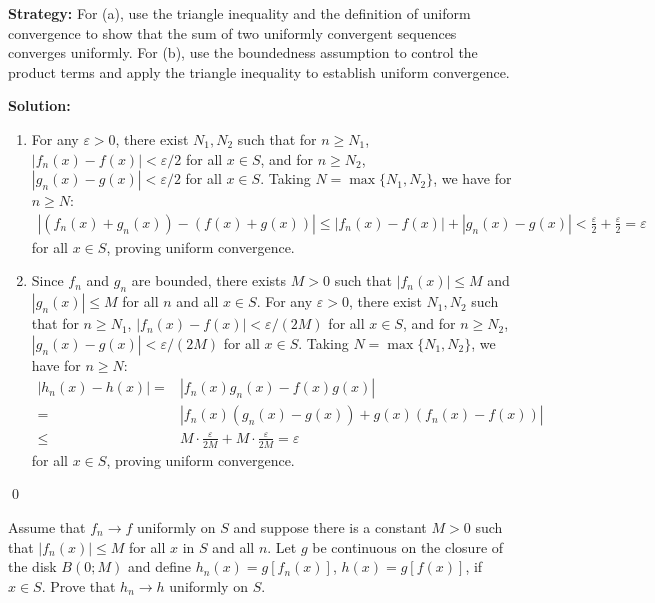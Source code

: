 \noindent\textbf{Strategy:} For (a), use the triangle inequality and the definition of uniform convergence to show that the sum of two uniformly convergent sequences converges uniformly. For (b), use the boundedness assumption to control the product terms and apply the triangle inequality to establish uniform convergence.

\bigskip\noindent\textbf{Solution:}
\begin{enumerate}[label=(\alph*)]
\item For any \( \varepsilon > 0 \), there exist \( N_1, N_2 \) such that for \( n \geq N_1 \), \( |f_n(x) - f(x)| < \varepsilon/2 \) for all \( x \in S \), and for \( n \geq N_2 \), \( |g_n(x) - g(x)| < \varepsilon/2 \) for all \( x \in S \). Taking \( N = \max\{N_1, N_2\} \), we have for \( n \geq N \):
\begin{align*}
|(f_n(x) + g_n(x)) - (f(x) + g(x))| \leq |f_n(x) - f(x)| + |g_n(x) - g(x)| < \frac{\varepsilon}{2} + \frac{\varepsilon}{2} = \varepsilon
\end{align*}
for all \( x \in S \), proving uniform convergence.

\item Since \( f_n \) and \( g_n \) are bounded, there exists \( M > 0 \) such that \( |f_n(x)| \leq M \) and \( |g_n(x)| \leq M \) for all \( n \) and all \( x \in S \). For any \( \varepsilon > 0 \), there exist \( N_1, N_2 \) such that for \( n \geq N_1 \), \( |f_n(x) - f(x)| < \varepsilon/(2M) \) for all \( x \in S \), and for \( n \geq N_2 \), \( |g_n(x) - g(x)| < \varepsilon/(2M) \) for all \( x \in S \). Taking \( N = \max\{N_1, N_2\} \), we have for \( n \geq N \):
\begin{align*}
|h_n(x) - h(x)| =& |f_n(x)g_n(x) - f(x)g(x)| \\
=& |f_n(x)(g_n(x) - g(x)) + g(x)(f_n(x) - f(x))| \\
\leq & M \cdot \frac{\varepsilon}{2M} + M \cdot \frac{\varepsilon}{2M} = \varepsilon
\end{align*}
for all \( x \in S \), proving uniform convergence.
\end{enumerate}\qed


\begin{problembox}
\begin{problemstatement}
Assume that \( f_n \to f \) uniformly on \( S \) and suppose there is a constant \( M > 0 \) such that \( |f_n(x)| \leq M \) for all \( x \) in \( S \) and all \( n \). Let \( g \) be continuous on the closure of the disk \( B(0; M) \) and define \( h_n(x) = g[f_n(x)] \), \( h(x) = g[f(x)] \), if \( x \in S \). Prove that \( h_n \to h \) uniformly on \( S \).
\end{problemstatement}
\end{problembox}

